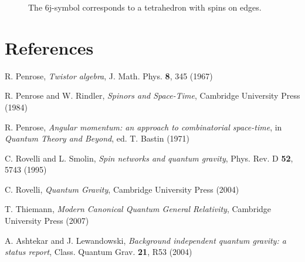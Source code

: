 \documentclass[11pt,a4paper,twoside]{book}
\theoremstyle{definition}
\begin{document}
\begin{figure}[htbp]
\centering
{}
\caption{The 6j-symbol corresponds to a tetrahedron with spins on edges.}
\end{figure}

\chapter*{References}

\begin{enumerate}[label={[\arabic*]}]
    \item R. Penrose, \textit{Twistor algebra}, J. Math. Phys. \textbf{8}, 345 (1967)
    \item R. Penrose and W. Rindler, \textit{Spinors and Space-Time}, 
          Cambridge University Press (1984)
    \item R. Penrose, \textit{Angular momentum: an approach to combinatorial 
          space-time}, in \textit{Quantum Theory and Beyond}, ed. T. Bastin (1971)
    \item C. Rovelli and L. Smolin, \textit{Spin networks and quantum gravity}, 
          Phys. Rev. D \textbf{52}, 5743 (1995)
    \item C. Rovelli, \textit{Quantum Gravity}, Cambridge University Press (2004)
    \item T. Thiemann, \textit{Modern Canonical Quantum General Relativity}, 
          Cambridge University Press (2007)
    \item A. Ashtekar and J. Lewandowski, \textit{Background independent quantum 
          gravity: a status report}, Class. Quantum Grav. \textbf{21}, R53 (2004)
\end{enumerate}
\end{document}
